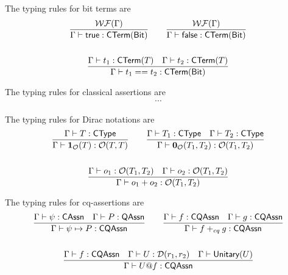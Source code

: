 The typing rules for bit terms are
\begin{gather*}
    \frac{\mathcal{WF}(\Gamma)}{\Gamma \vdash \textsf{true}: \textsf{CTerm}(\textsf{Bit})}
    \qquad
    \frac{\mathcal{WF}(\Gamma)}{\Gamma \vdash \textsf{false}: \textsf{CTerm}(\textsf{Bit})} \\
    \\
    \frac{\Gamma \vdash t_1 : \textsf{CTerm}(T) \quad \Gamma \vdash t_2 : \textsf{CTerm}(T)}{\Gamma \vdash t_1 == t_2 : \textsf{CTerm}(\textsf{Bit})}
\end{gather*}

The typing rules for classical assertions are
\begin{gather*}
    \cdots
\end{gather*}

The typing rules for Dirac notations are
\begin{gather*}
    \frac{\Gamma \vdash T : \textsf{CType}}{\Gamma \vdash \mathbf{1}_\mathcal{O}(T) : \mathcal{O}(T, T)}
    \qquad
    \frac{\Gamma \vdash T_1 : \textsf{CType} \quad \Gamma \vdash T_2 : \textsf{CType}}{\Gamma \vdash \mathbf{0}_\mathcal{O}(T_1, T_2) : \mathcal{O}(T_1, T_2)} \\
    \\
    \frac{\Gamma \vdash o_1 : \mathcal{O}(T_1, T_2) \quad \Gamma \vdash o_2 : \mathcal{O}(T_1, T_2)}{\Gamma \vdash o_1 + o_2 : \mathcal{O}(T_1, T_2)}
\end{gather*}

The typing rules for cq-assertions are
\begin{gather*}
    \frac{\Gamma \vdash \psi : \textsf{CAssn} \quad \Gamma \vdash P : \textsf{QAssn}}{\Gamma \vdash \psi \mapsto P : \textsf{CQAssn}}
    \qquad
    \frac{\Gamma \vdash f : \textsf{CQAssn} \quad \Gamma \vdash g : \textsf{CQAssn}}{\Gamma \vdash f +_{cq} g : \textsf{CQAssn}} \\
    \\
    \frac{\Gamma \vdash f : \textsf{CQAssn} \quad \Gamma \vdash U : \mathcal{D}(r_1, r_2) \quad \Gamma \vdash \textsf{Unitary}({U})}{\Gamma \vdash U@f : \textsf{CQAssn}}
\end{gather*}


